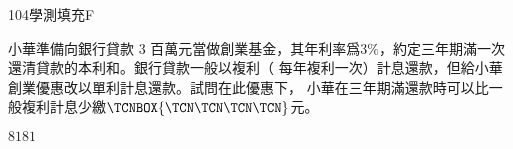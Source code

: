 \begin{QUESTION}
\begin{QSOLLIST}
        \end{QSOLLIST}
        \begin{QEMPTYSPACE}
        \end{QEMPTYSPACE}
    \end{QUESTION}
    \begin{QUESTION}
        \begin{ExamInfo}{104}{學測}{填充}{F}
        \end{ExamInfo}
        \begin{ExamAnsRateInfo}{26}{57}{18}{3}
        \end{ExamAnsRateInfo}
        \begin{QBODY}
            小華準備向銀行貸款 $3$ 百萬元當做創業基金，其年利率爲$3\%$，約定三年期滿一次還清貸款的本利和。銀行貸款一般以複利（ 每年複利一次）計息還款，但給小華創業優惠改以單利計息還款。試問在此優惠下， 小華在三年期滿還款時可以比一般複利計息少繳$\TCNBOX{\TCN\TCN\TCN\TCN }$元。
        \end{QBODY}
        \begin{QFROMS}
        \end{QFROMS}
        \begin{QTAGS}\end{QTAGS}
        \begin{QANS}
            $8181$
        \end{QANS}
        \begin{QSOLLIST}
        \end{QSOLLIST}
        \begin{QEMPTYSPACE}
        \end{QEMPTYSPACE}
    \end{QUESTION}
